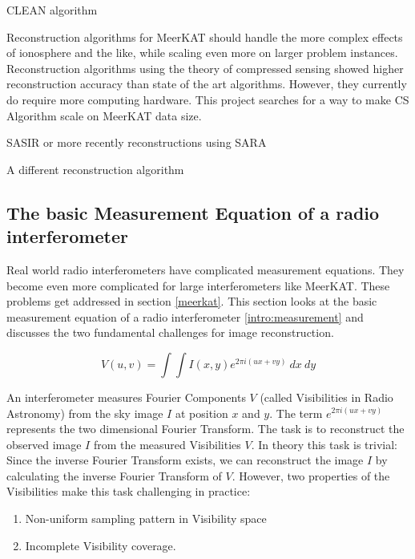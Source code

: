 CLEAN algorithm\cite{rich2008multi}\cite{rau2011multi}

Reconstruction algorithms for MeerKAT should handle the more complex effects of ionosphere and the like, while scaling even more on larger problem instances. Reconstruction algorithms using the theory of compressed sensing\cite{candes2006robust}\cite{donoho2006compressed} showed higher reconstruction accuracy than state of the art algorithms. However, they currently do require more computing hardware. This project searches for a way to make CS Algorithm scale on MeerKAT data size.

SASIR\cite{girard2015sparse} or more recently reconstructions using SARA \cite{dabbech2018cygnus} \cite{birdi2018sparse}



A different reconstruction algorithm

\subsection{The basic Measurement Equation of a radio interferometer}\label{intro:basic}
Real world radio interferometers have complicated measurement equations. They become even more complicated for large interferometers like MeerKAT. These problems get addressed in section \ref{meerkat}. This section looks at the basic measurement equation of a radio interferometer \eqref{intro:measurement} and discusses the two fundamental challenges for image reconstruction. 

\begin{equation}\label{intro:measurement}
V(u, v) = \int\int I(x, y) e^{2 \pi i (ux+vy)} \: dx \: dy
\end{equation}

An interferometer measures Fourier Components $V$ (called Visibilities in Radio Astronomy) from the sky image $I$ at position $x$ and $y$. The term $e^{2 \pi i (ux+vy)}$ represents the two dimensional Fourier Transform. The task is to reconstruct the observed image $I$ from the measured Visibilities $V$. In theory this task is trivial: Since the inverse Fourier Transform exists, we can reconstruct the image $I$ by calculating the inverse Fourier Transform of $V$. However, two properties of the Visibilities make this task challenging in practice:

\begin{enumerate}
	\item Non-uniform sampling pattern in Visibility space
	\item Incomplete Visibility coverage. 
\end{enumerate} 

